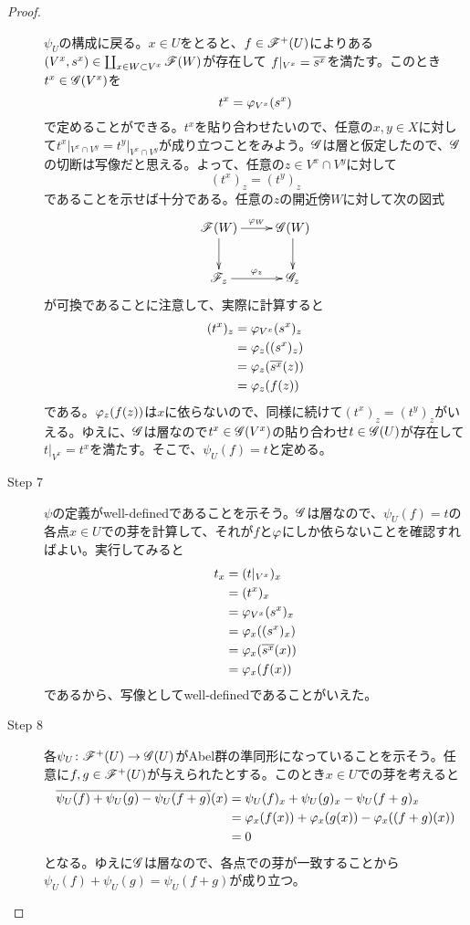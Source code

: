 \begin{proof}
\begin{description}
$\psi_U$の構成に戻る。$x \in U$をとると、$f \in \mathscr{F}^+(U)$によりある$(V^x, s^x) \in \coprod_{x \in W \subset V^x} \mathscr{F}(W)$が存在して
$f|_{V^x} = \overline{s^x}$を満たす。このとき$t^x \in \mathscr{G}(V^x)$を
\[
t^x = {\varphi}_{V^x} (s^x)
\]
で定めることができる。$t^x$を貼り合わせたいので、任意の$x,y \in X$に対して$t^x|_{V^x \cap V^y} = t^y|_{V^x \cap V^y}$が成り立つことをみよう。$\mathscr{G}$は層と仮定したので、$\mathscr{G}$の切断は写像だと思える。よって、任意の$z \in V^x \cap V^y$に対して
\[
(t^x)_z = (t^y)_z
\]
であることを示せば十分である。任意の$z$の開近傍$W$に対して次の図式
\[
\xymatrix{
\scrf(W) \ar[r]^-{\vp_W} \ar[d] & \scrg(W) \ar[d] \\
\scrf_z \ar[r]^-{\vp_z} & \scrg_z
}
\]
が可換であることに注意して、実際に計算すると
\begin{align*}
  (t^x)_z &= {\varphi}_{V^x} (s^x)_z \\
  &= {\varphi}_z((s^x)_z )  \\
  &= {\varphi}_z (\overline{s^x}(z)) \\
  &= {\varphi}_z(f(z))
\end{align*}
である。${\varphi}_z(f(z))$は$x$に依らないので、同様に続けて$(t^x)_z = (t^y)_z$がいえる。ゆえに、$\mathscr{G}$は層なので$t^x \in  \mathscr{G}(V^x)$の貼り合わせ$t \in \mathscr{G}(U)$が存在して$t|_{V^x} = t^x$を満たす。そこで、$\psi_U(f) = t$と定める。
\item[Step 7] $\psi$の定義がwell-definedであることを示そう。$\mathscr{G}$は層なので、$\psi_U(f) = t$の各点$x \in U$での芽を計算して、それが$f$と${\varphi}$にしか依らないことを確認すればよい。実行してみると
\begin{align*}
  t_x &= (t|_{V^x})_x \\
  &= (t^x)_x \\
  &= {\varphi}_{V^x}(s^x)_x \\
  &= {\varphi}_x((s^x)_x) \\
  &= {\varphi}_x(\overline{s^x}(x)) \\
  &= {\varphi}_x(f(x))
\end{align*}
であるから、写像としてwell-definedであることがいえた。
\item[Step 8] 各$\psi_U \colon \mathscr{F}^+(U) \to\mathscr{G}(U)$がAbel群の準同形になっていることを示そう。任意に$f,g \in \mathscr{F}^+(U)$が与えられたとする。このとき$x \in U$での芽を考えると
\begin{align*}
  \overline{\psi_U(f) + \psi_U(g) - \psi_U(f + g)}(x) &= \psi_U(f)_x + \psi_U(g)_x - \psi_U(f + g)_x \\
  &= {\varphi}_x(f(x)) + {\varphi}_x(g(x)) - {\varphi}_x((f+g)(x)) \\
  &= 0
\end{align*}
となる。ゆえに$\mathscr{G}$は層なので、各点での芽が一致することから$\psi_U(f) + \psi_U(g) = \psi_U(f + g)$が成り立つ。

\end{description}
\end{proof}
